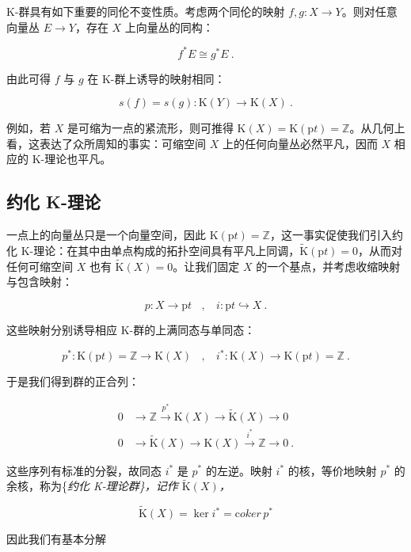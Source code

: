 \documentclass[11pt,a4paper]{ctexart}
\newcommand{\SrcRange}[2]{\marginpar{\raggedright\footnotesize 原文 p.#1}}
\begin{document}
K-群具有如下重要的同伦不变性质。考虑两个同伦的映射 \(f,g: X\rightarrow Y\)。则对任意向量丛 \(E\rightarrow Y\)，存在 \(X\) 上向量丛的同构：

\[f^*E\cong g^*E\ .\]

由此可得 \(f\) 与 \(g\) 在 K-群上诱导的映射相同：

\[s(f)=s(g):{\mathrm K}(Y)\longrightarrow {\mathrm K}(X)\ .\]

例如，若 \(X\) 是可缩为一点的紧流形，则可推得 \({\mathrm K}(X)={\mathrm K}({\mathrm pt})= {\mathbb{Z}}\)。从几何上看，这表达了众所周知的事实：可缩空间 \(X\) 上的任何向量丛必然平凡，因而 \(X\) 相应的 K-理论也平凡。

\SrcRange{15}{15}
\subsection{约化 K-理论}\label{ux7ea6ux5316-k-ux7406ux8bba}

一点上的向量丛只是一个向量空间，因此 \({\mathrm K}({\mathrm pt})={\mathbb{Z}}\)，这一事实促使我们引入约化 K-理论：在其中由单点构成的拓扑空间具有平凡上同调，\(\widetilde{{\mathrm K}}({\mathrm pt})=0\)，从而对任何可缩空间 \(X\) 也有 \(\widetilde{{\mathrm K}}(X)=0\)。让我们固定 \(X\) 的一个基点，并考虑收缩映射与包含映射：

\[p:X\longrightarrow {\mathrm pt}~~~~,~~~~i:{\mathrm pt}\hookrightarrow X\ .\]

这些映射分别诱导相应 K-群的上满同态与单同态：

\[p^*:{\mathrm K}({\mathrm pt})= {\mathbb{Z}}\longrightarrow {\mathrm K}(X)~~~~,~~~~i^*:
{\mathrm K}(X)\longrightarrow {\mathrm K}({\mathrm pt})= {\mathbb{Z}}\ .\]

于是我们得到群的正合列：

\[\begin{matrix}
0 &\longrightarrow {\mathbb{Z}}\stackrel{p^*}{\longrightarrow} {\mathrm K}(X)\longrightarrow \widetilde{{\mathrm K}}(X)\longrightarrow 0 \\
0 &\longrightarrow \widetilde{{\mathrm K}}(X)\longrightarrow {\mathrm K}(X)\stackrel{i^*}{\longrightarrow} {\mathbb{Z}}\longrightarrow 0\ .
\end{matrix}\]

这些序列有标准的分裂，故同态 \(i^*\) 是 \(p^*\) 的左逆。映射 \(i^*\) 的核，等价地映射 \(p^*\) 的余核，称为\{\it 约化 K-理论群\}，记作 \(\widetilde{{\mathrm K}}(X)\)，

\[\widetilde{{\mathrm K}}(X)= \ker i^*={\mathrm coker}\,p^*\]

因此我们有基本分解
\end{document}
